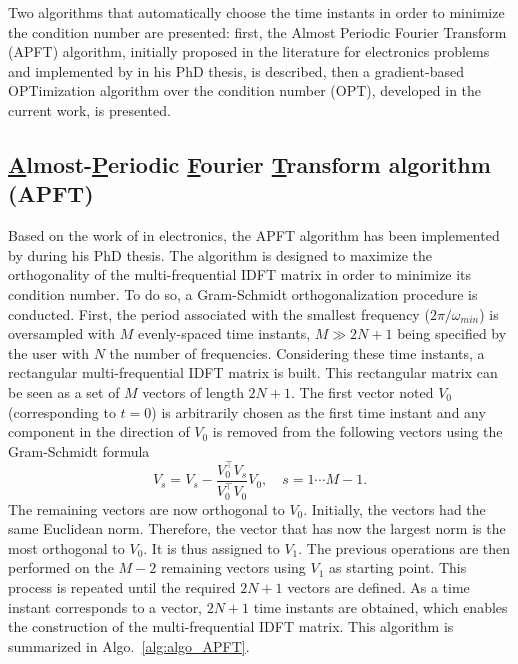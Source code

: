 
Two algorithms that automatically choose the time instants in order to
minimize the condition number are presented: first, the Almost
Periodic Fourier Transform (APFT) algorithm, initially proposed in the
literature for electronics problems and implemented by
\citet{ThesisGuedeney} in his PhD thesis, is described, then a gradient-based
OPTimization algorithm over the condition number (OPT), developed in
the current work, is presented.

\subsection{\texorpdfstring{\underline{A}}{A}lmost-\texorpdfstring{\underline{P}}{P}eriodic
\texorpdfstring{\underline{F}}{F}ourier \texorpdfstring{\underline{T}}{T}ransform 
algorithm (APFT)}
\label{sec:apft_algorithm}
Based on the work of \citet{Kundert1988} in
electronics, the APFT
algorithm has been implemented by \citet{ThesisGuedeney} 
during his PhD thesis. The algorithm is designed
to maximize the orthogonality of the multi-frequential
IDFT matrix in order to minimize its condition number. To do so, a
Gram-Schmidt orthogonalization procedure is conducted.  First, the period 
associated with the smallest frequency ($2 \pi / \omega_{min}$) 
is oversampled with $M$ evenly-spaced time
instants, $M\gg2N+1$ being specified by the user with $N$ the number of
frequencies. Considering these time instants, a rectangular
multi-frequential IDFT matrix is built. This rectangular matrix can be seen
as a set of $M$ vectors of length $2N+1$.
The first vector noted $V_0$ (corresponding
to $t=0$) is arbitrarily chosen as the first time instant and any
component in the direction of $V_0$ is removed from the following
vectors using the Gram-Schmidt formula
\begin{equation}
   V_s = V_s - \frac{V_0^\top V_s}{V_0^\top V_0} V_0, \quad s=1 \cdots M-1.
   \label{GramSchmidtAlgo}
\end{equation}
The remaining vectors are now orthogonal to $V_0$. 
Initially, the vectors had the same Euclidean norm.
Therefore, the vector that has now the largest norm is
the most orthogonal to $V_0$.
It is thus assigned to $V_1$. The previous
operations are then performed on the $M-2$ remaining vectors using $V_1$
as starting point. This process is repeated until the required $2N+1$ vectors
are defined. As a time instant corresponds to a vector, $2N+1$ time instants are obtained, 
which enables the construction of the multi-frequential
IDFT matrix. This algorithm is summarized in
Algo.~\ref{alg:algo_APFT}.

